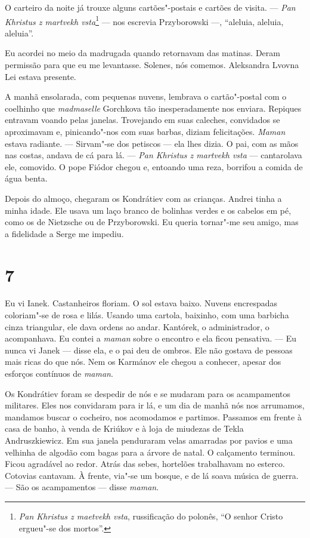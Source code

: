 O carteiro da noite já trouxe alguns cartões"-postais e cartões de
visita. --- \emph{Pan Khristus z martvekh vsta}\footnote{\emph{Pan
  Khristus z maetvekh vsta}, russificação do polonês, ``O senhor Cristo
  ergueu"-se dos mortos''.} --- nos escrevia Przyborowski ---, ``aleluia,
aleluia, aleluia''.

Eu acordei no meio da madrugada quando retornavam das matinas. Deram
permissão para que eu me levantasse. Solenes, nós comemos. Aleksandra
Lvovna Lei estava presente.

A manhã ensolarada, com pequenas nuvens, lembrava o cartão"-postal com o
coelhinho que \emph{madmaselle} Gorchkova tão inesperadamente nos
enviara. Repiques entravam voando pelas janelas. Trovejando em suas
caleches, convidados se aproximavam e, pinicando"-nos com suas barbas,
diziam felicitações. \emph{Maman} estava radiante. --- Sirvam"-se dos
petiscos --- ela lhes dizia. O pai, com as mãos nas costas, andava de cá
para lá. --- \emph{Pan Khristus z martvekh vsta} --- cantarolava ele,
comovido. O pope Fiódor chegou e, entoando uma reza, borrifou a comida
de água benta.

Depois do almoço, chegaram os Kondrátiev com as crianças. Andrei tinha a
minha idade. Ele usava um laço branco de bolinhas verdes e os cabelos em
pé, como os de Nietzsche ou de Przyborowski. Eu queria tornar"-me seu
amigo, mas a fidelidade a Serge me impediu.

\section{7}

Eu vi Ianek. Castanheiros floriam. O sol estava baixo. Nuvens
encrespadas coloriam"-se de rosa e lilás. Usando uma cartola, baixinho,
com uma barbicha cinza triangular, ele dava ordens ao andar. Kantórek, o
administrador, o acompanhava. Eu contei a \emph{maman} sobre o encontro
e ela ficou pensativa. --- Eu nunca vi Janek --- disse ela, e o pai deu
de ombros. Ele não gostava de pessoas mais ricas do que nós. Nem os
Karmánov ele chegou a conhecer, apesar dos esforços contínuos de
\emph{maman}.

Os Kondrátiev foram se despedir de nós e se mudaram para os acampamentos
militares. Eles nos convidaram para ir lá, e um dia de manhã nós nos
arrumamos, mandamos buscar o cocheiro, nos acomodamos e partimos.
Passamos em frente à casa de banho, à venda de Kriúkov e à loja de
miudezas de Tekla Andruszkiewicz. Em sua janela penduraram velas
amarradas por pavios e uma velhinha de algodão com bagas para a árvore
de natal. O calçamento terminou. Ficou agradável ao redor. Atrás das
sebes, hortelões trabalhavam no esterco. Cotovias cantavam. À frente,
via"-se um bosque, e de lá soava música de guerra. --- São os
acampamentos --- disse \emph{maman}.

